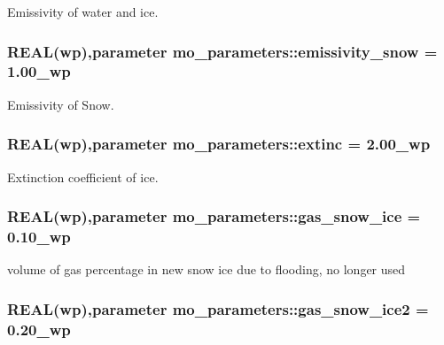 Emissivity of water and ice. 

\hypertarget{namespacemo__parameters_abc3aaec08d9a954bf5ddbe3a8ba692e5}{
\subsubsection[{emissivity\_\-snow}]{\setlength{\rightskip}{0pt plus 5cm}REAL({\bf wp}),parameter {\bf mo\_\-parameters::emissivity\_\-snow} = 1.00\_\-wp}}
\label{namespacemo__parameters_abc3aaec08d9a954bf5ddbe3a8ba692e5}


Emissivity of Snow. 

\hypertarget{namespacemo__parameters_a15c1092bdb139242bbe5ca253a9cfc70}{
\subsubsection[{extinc}]{\setlength{\rightskip}{0pt plus 5cm}REAL({\bf wp}),parameter {\bf mo\_\-parameters::extinc} = 2.00\_\-wp}}
\label{namespacemo__parameters_a15c1092bdb139242bbe5ca253a9cfc70}


Extinction coefficient of ice. 

\hypertarget{namespacemo__parameters_a37ad2fc4cadab9eda79a630a8744079e}{
\subsubsection[{gas\_\-snow\_\-ice}]{\setlength{\rightskip}{0pt plus 5cm}REAL({\bf wp}),parameter {\bf mo\_\-parameters::gas\_\-snow\_\-ice} = 0.10\_\-wp}}
\label{namespacemo__parameters_a37ad2fc4cadab9eda79a630a8744079e}


volume of gas percentage in new snow ice due to flooding, no longer used 

\hypertarget{namespacemo__parameters_ad2c04994a7c8e261cbdaa50e2790cd56}{
\subsubsection[{gas\_\-snow\_\-ice2}]{\setlength{\rightskip}{0pt plus 5cm}REAL({\bf wp}),parameter {\bf mo\_\-parameters::gas\_\-snow\_\-ice2} = 0.20\_\-wp}}
\label{namespacemo__parameters_ad2c04994a7c8e261cbdaa50e2790cd56}


